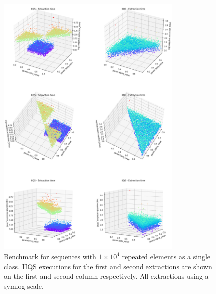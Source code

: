 \begin{figure}[p]
    \centering
    \includegraphics[width=0.8\textwidth]{./fragments/04_experimental_execution/images/04_alphabeta_singleclass.png}
    \caption{Benchmark for sequences with $1\times10^4$ repeated elements as a single class. IIQS executions for the first and second extractions are shown on the first and second column respectively. All extractions using a symlog scale.}
    \label{FIG:05_ALPHABETA_RELATIONSHIP_SINGLECLASS}
\end{figure}



